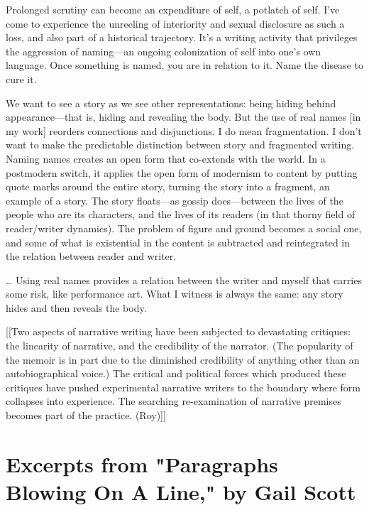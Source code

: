 \documentclass[
]{memoir}
\begin{document}
Prolonged scrutiny can become an expenditure of self, a potlatch of
self. I've come to experience the unreeling of interiority and sexual
disclosure as such a loss, and also part of a historical trajectory.
It's a writing activity that privileges the aggression of naming---an
ongoing colonization of self into one's own language. Once something is
named, you are in relation to it. Name the disease to cure it.

We want to see a story as we see other representations: being hiding
behind appearance---that is, hiding and revealing the body. But the use
of real names {[}in my work{]} reorders connections and disjunctions. I
do mean fragmentation. I don't want to make the predictable distinction
between story and fragmented writing. Naming names creates an open form
that co-extends with the world. In a postmodern switch, it applies the
open form of modernism to content by putting quote marks around the
entire story, turning the story into a fragment, an example of a story.
The story floats---as gossip does---between the lives of the people who
are its characters, and the lives of its readers (in that thorny field
of reader/writer dynamics). The problem of figure and ground becomes a
social one, and some of what is existential in the content is subtracted
and reintegrated in the relation between reader and writer.

\ldots{} Using real names provides a relation between the writer and
myself that carries some risk, like performance art. What I witness is
always the same: any story hides and then reveals the body.

{[}{[}Two aspects of narrative writing have been subjected to
devastating critiques: the linearity of narrative, and the credibility
of the narrator. (The popularity of the memoir is in part due to the
diminished credibility of anything other than an autobiographical
voice.) The critical and political forces which produced these critiques
have pushed experimental narrative writers to the boundary where form
collapses into experience. The searching re-examination of narrative
premises becomes part of the practice. (Roy){]}{]}

\hypertarget{excerpts-from-paragraphs-blowing-on-a-line-by-gail-scott}{%
\section*{Excerpts from "Paragraphs Blowing On A Line," by Gail
Scott}\label{excerpts-from-paragraphs-blowing-on-a-line-by-gail-scott}}
\end{document}
